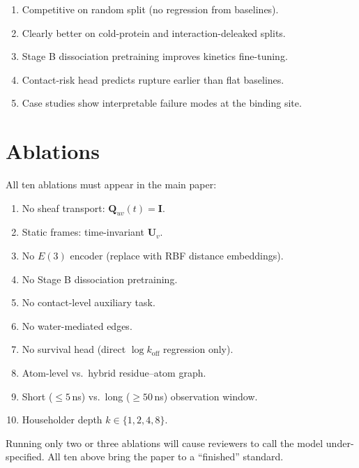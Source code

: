 \documentclass[12pt,a4paper]{article}
\begin{document}
\begin{resultbox}
\begin{enumerate}[noitemsep,label=\arabic*.]
  \item Competitive on random split (no regression from baselines).
  \item Clearly better on cold-protein and interaction-deleaked splits.
  \item Stage B dissociation pretraining improves kinetics fine-tuning.
  \item Contact-risk head predicts rupture earlier than flat baselines.
  \item Case studies show interpretable failure modes at the binding site.
\end{enumerate}
\end{resultbox}

\section{Ablations}
\label{sec:ablations}

All ten ablations must appear in the main paper:

\begin{enumerate}[noitemsep]
  \item No sheaf transport: $\mathbf{Q}_{uv}(t)=\mathbf{I}$.
  \item Static frames: time-invariant $\mathbf{U}_v$.
  \item No $E(3)$ encoder (replace with RBF distance embeddings).
  \item No Stage B dissociation pretraining.
  \item No contact-level auxiliary task.
  \item No water-mediated edges.
  \item No survival head (direct $\log k_{\text{off}}$ regression only).
  \item Atom-level vs.\ hybrid residue--atom graph.
  \item Short (${\le}5$\,ns) vs.\ long (${\ge}50$\,ns) observation window.
  \item Householder depth $k\in\{1,2,4,8\}$.
\end{enumerate}

\begin{warnbox}
Running only two or three ablations will cause reviewers to call the model
under-specified.
All ten above bring the paper to a ``finished'' standard.
\end{warnbox}
\end{document}
